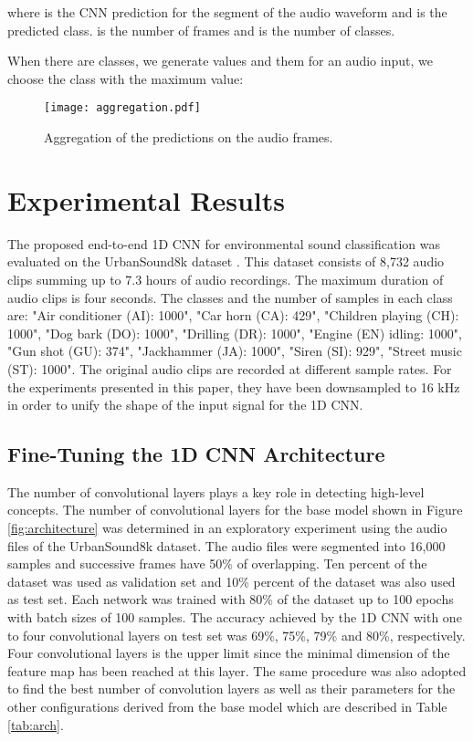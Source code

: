 \documentclass[preprint,final,12pt]{elsarticle}
\begin{document}
\noindent where  is the CNN prediction for the  segment of the audio waveform  and  is the predicted class.  is the number of frames and  is the number of classes.



When there are  classes, we generate  values and them for an audio input, we choose the class with the maximum  value: 



\begin{figure*}[htpb!]
  \centering
  \texttt{[image: aggregation.pdf]}
  \caption{Aggregation of the predictions on the audio frames.}
  \label{fig:agg}
\end{figure*}



\section{Experimental Results}
\label{sec:res}
The proposed end-to-end 1D CNN for environmental sound classification was evaluated on the UrbanSound8k dataset \citep{Salamon:2014:DTU:2647868.2655045}. This dataset consists of 8,732 audio clips summing up to 7.3 hours of audio recordings. The maximum duration of audio clips is four seconds. The classes and the number of samples in each class are: "Air conditioner (AI): 1000", "Car horn (CA): 429", "Children playing (CH): 1000", "Dog bark (DO): 1000", "Drilling (DR): 1000", "Engine (EN) idling: 1000", "Gun shot (GU): 374", "Jackhammer (JA): 1000", "Siren (SI): 929", "Street music (ST): 1000". The original audio clips are recorded at different sample rates. For the experiments presented in this paper, they have been downsampled to 16 kHz in order to unify the shape of the input signal for the 1D CNN.  

\subsection{Fine-Tuning the 1D CNN Architecture}
The number of convolutional layers plays a key role in detecting high-level concepts. The number of convolutional layers for the base model shown in Figure \ref{fig:architecture} was determined in an exploratory experiment using the audio files of the UrbanSound8k dataset. The audio files were segmented into 16,000 samples and successive frames have 50\% of overlapping. Ten percent of the dataset was used as validation set and 10\% percent of the dataset was also used as test set. Each network was trained with 80\% of the dataset up to 100 epochs with batch sizes of 100 samples. The accuracy achieved by the 1D CNN with one to four convolutional layers on test set was 69\%, 75\%, 79\% and 80\%, respectively. Four convolutional layers is the upper limit since the minimal dimension of the feature map has been reached at this layer. The same procedure was also adopted to find the best number of convolution layers as well as their parameters for the other configurations derived from the base model which are described in Table \ref{tab:arch}.
\end{document}
